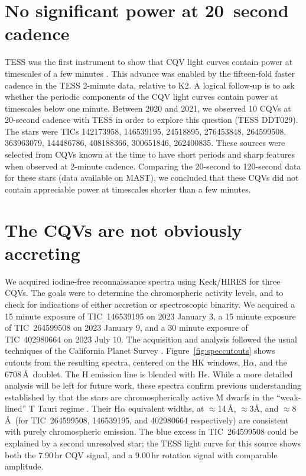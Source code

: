 \documentclass[11pt,twocolumn,tighten]{aastex63}
\begin{document}
\section{No significant power at 20~second cadence}

TESS was the first instrument to show that CQV light curves contain
power at timescales of a few minutes
\citep{2019ApJ...876..127Z,2022AJ....163..144G}.  This advance was
enabled by the fifteen-fold faster cadence in the TESS 2-minute data,
relative to K2.  A logical follow-up is to ask whether the periodic
components of the CQV light curves contain power at timescales below
one minute.  Between 2020 and 2021, we observed 10 CQVs at 20-second
cadence with TESS in order to explore this question (TESS DDT029).
The stars were TICs 142173958, 146539195, 24518895, 276453848,
264599508, 363963079, 144486786, 408188366, 300651846, 262400835.
These sources were selected from CQVs known at the time to have short
periods and sharp features when observed at 2-minute cadence.
Comparing the 20-second to 120-second data for these stars (data
available on MAST), we concluded that these CQVs did not contain
appreciable power at timescales shorter than a few minutes.


\section{The CQVs are not obviously accreting}

We acquired iodine-free reconnaissance spectra using Keck/HIRES for
three CQVs.  The goals were to determine the chromospheric activity
levels, and to check for indications of either accretion or
spectroscopic binarity.  We acquired a 15 minute exposure of
TIC~146539195 on 2023 January 3, a 15 minute exposure of TIC~264599508
on 2023 January 9, and a 30 minute exposure of TIC~402980664 on 2023
July 10.  The acquisition and analysis followed the usual techniques
of the California Planet Survey \citep{2010ApJ...721.1467H}.
Figure~\ref{fig:speccutouts} shows cutouts from the resulting spectra,
centered on the  HK windows, H$\alpha$, and the 
6708\,\AA\ doublet.  The  H emission line is blended with
H$\epsilon$.  While a more detailed analysis will be left for future
work, these spectra confirm previous understanding established by
\citet{2017AJ....153..152S} that the stars are chromospherically
active M dwarfs in the ``weak-lined'' T Tauri regime
\citep[e.g.][Figure~15]{2019AJ....157...85B}.  Their H$\alpha$
equivalent widths, at $\approx$14\,\AA, $\approx$3\AA, and
$\approx$8\,\AA\ (for TIC~264599508, 146539195, and 402980664
respectively) are consistent with purely chromospheric emission.  The
blue excess in TIC~264599508 could be explained by a second unresolved
star; the TESS light curve for this source shows both the 7.90\,hr CQV
signal, and a 9.00\,hr rotation signal with comparable amplitude.
\end{document}
